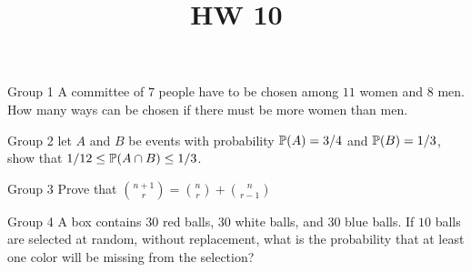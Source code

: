\documentclass{article}
\title{HW 10}
\author{}
\date{}
\begin{document}
\maketitle

\iffalse
\begin{problem}
    {Group 1}
    Given number $\set{0,1,2,3,4,5}$, how many odd numbers can be formed with $5$ unrepeated digits?
\end{problem}

\begin{problem}
    {Group 2}
    Six couples sitting in a table. How many ways can they be seated such that all couples sits together?
\end{problem}

\begin{problem}
    {Group 3}
    We want to order $4$ green balls, $3$ red balls, and $2$ blue balls. The green balls cannot be next to each other. How many ways can we do that?
\end{problem}

\begin{problem}
    {Group 4}
    We want to place $10$ balls in $7$ boxes. How many ways can we do that?
\end{problem}

\begin{problem}
    {Group 5}
    There are $8$ books on a shelf, of $2$ are paperbacks and $6$ are hardbacks. How many possible selections of $4$ books from this shelf Include at least one paperback?
\end{problem}
\fi
\iffalse
\begin{problem}
    {Group 1}
    A committee of $7$ people have to be chosen among $11$ women and $8$ men. How many ways can be chosen if there must be more women than men.
\end{problem}

\begin{problem}
    {Group 2}
    let $A$ and $B$ be events with probability $\P{A}=3/4$ and $\P{B}=1/3$, show that $1/12\leq \P{A\cap B}\leq 1/3$.
\end{problem}

\begin{problem}
    {Group 3}
    Prove that $\binom{n+1}{r}=\binom{n}{r}+\binom{n}{r-1}$
\end{problem}

\begin{problem}
    {Group 4}
    A box contains $30$ red balls, $30$ white balls, and $30$ blue balls. If $10$ balls are selected at random, without replacement, what is the probability that at least one color will be missing from the selection?
\end{problem}
\end{document}

